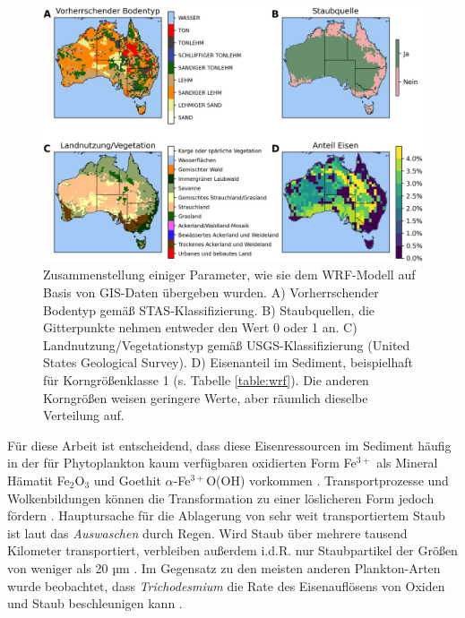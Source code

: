 \documentclass[12pt,a4paper,onecolumn]{scrartcl}
\begin{document}
\begin{figure}[!htb]
\includegraphics[width=\textwidth]{bilder/soil_type_iron.png}
\caption{Zusammenstellung einiger Parameter, wie sie dem WRF-Modell auf Basis von GIS-Daten übergeben wurden. A) Vorherrschender Bodentyp gemäß STAS-Klassifizierung. B) Staubquellen, die Gitterpunkte nehmen entweder den Wert 0 oder 1 an. C) Landnutzung/Vegetationstyp gemäß USGS-Klassifizierung (United States Geological Survey). D) Eisenanteil im Sediment, beispielhaft für Korngrößenklasse 1 (s. Tabelle \ref{table:wrf}). Die anderen Korngrößen weisen geringere Werte, aber räumlich dieselbe Verteilung auf.} \label{fig:soil_type_iron}
\end{figure}
Für diese Arbeit ist entscheidend, dass diese Eisenressourcen im Sediment häufig in der für Phytoplankton kaum verfügbaren oxidierten Form Fe$^{3+}$ als Mineral Hämatit Fe$_2$O$_3$ und Goethit $\alpha$-Fe$^{3+}$O(OH) vorkommen \citep{Reynolds.2014}. Transportprozesse und Wolkenbildungen können die Transformation zu einer löslicheren Form jedoch fördern \citep{Shao.2011}. Hauptursache für die Ablagerung von sehr weit transportiertem Staub ist laut \citet{Marx.2018} das \textit{Auswaschen} durch Regen. Wird Staub über mehrere tausend Kilometer transportiert, verbleiben außerdem  i.d.R. nur Staubpartikel der Größen von weniger als 20 µm \citep{Marx.2018}. Im Gegensatz zu den meisten anderen Plankton-Arten wurde beobachtet, dass \textit{Trichodesmium} die Rate des Eisenauflösens von Oxiden und Staub beschleunigen kann \citep{Rubin.2011}.
\end{document}
